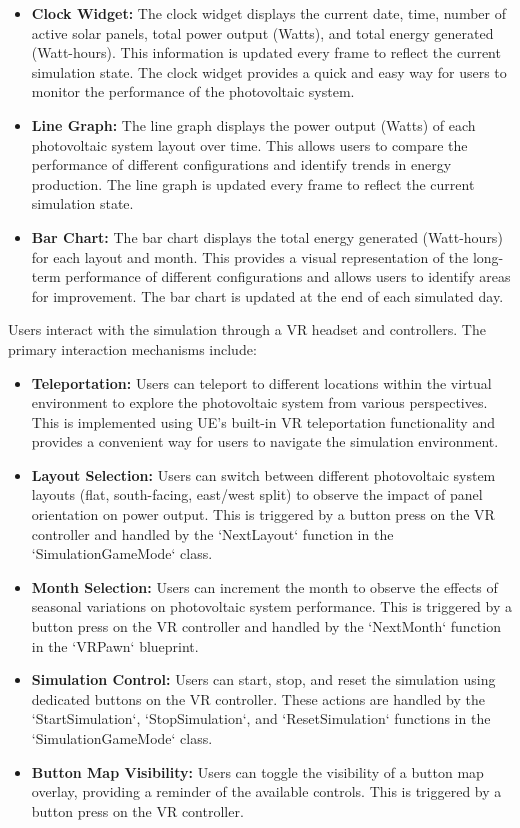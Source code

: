 \documentclass[draft, final]{vutinfth} %
\begin{document}
\begin{itemize}
    \item \textbf{Clock Widget:} The clock widget displays the current date, time, number of active solar panels, total power output (Watts), and total energy generated (Watt-hours). This information is updated every frame to reflect the current simulation state. The clock widget provides a quick and easy way for users to monitor the performance of the photovoltaic system.
    \item \textbf{Line Graph:} The line graph displays the power output (Watts) of each photovoltaic system layout over time. This allows users to compare the performance of different configurations and identify trends in energy production. The line graph is updated every frame to reflect the current simulation state.
    \item \textbf{Bar Chart:} The bar chart displays the total energy generated (Watt-hours) for each layout and month. This provides a visual representation of the long-term performance of different configurations and allows users to identify areas for improvement. The bar chart is updated at the end of each simulated day.
\end{itemize}

Users interact with the simulation through a VR headset and controllers. The primary interaction mechanisms include:

\begin{itemize}
    \item \textbf{Teleportation:} Users can teleport to different locations within the virtual environment to explore the photovoltaic system from various perspectives. This is implemented using UE's built-in VR teleportation functionality and provides a convenient way for users to navigate the simulation environment.
    \item \textbf{Layout Selection:} Users can switch between different photovoltaic system layouts (flat, south-facing, east/west split) to observe the impact of panel orientation on power output. This is triggered by a button press on the VR controller and handled by the `NextLayout` function in the `SimulationGameMode` class.
    \item \textbf{Month Selection:} Users can increment the month to observe the effects of seasonal variations on photovoltaic system performance. This is triggered by a button press on the VR controller and handled by the `NextMonth` function in the `VRPawn` blueprint.
    \item \textbf{Simulation Control:} Users can start, stop, and reset the simulation using dedicated buttons on the VR controller. These actions are handled by the `StartSimulation`, `StopSimulation`, and `ResetSimulation` functions in the `SimulationGameMode` class.
    \item \textbf{Button Map Visibility:} Users can toggle the visibility of a button map overlay, providing a reminder of the available controls. This is triggered by a button press on the VR controller.
\end{itemize}
\end{document}
